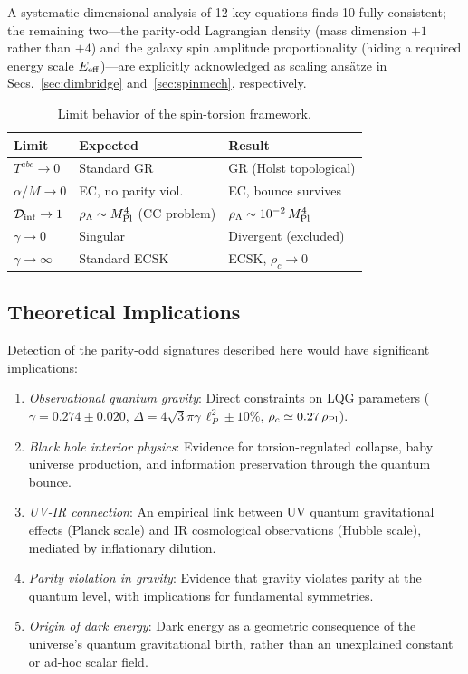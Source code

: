 \documentclass[aps,prd,twocolumn,superscriptaddress,showpacs,preprintnumbers,nofootinbib,longbibliography,floatfix]{revtex4-2}
\newcommand{\Dinf}{\mathcal{D}_{\rm inf}}
\newcommand{\rhoPl}{\rho_{\rm Pl}}
\newcommand{\MPl}{M_{\rm Pl}}
\begin{document}
A systematic dimensional analysis of 12 key equations finds 10 fully consistent; the remaining two---the parity-odd Lagrangian density (mass dimension $+1$ rather than $+4$) and the galaxy spin amplitude proportionality (hiding a required energy scale $E_{\rm eff}$)---are explicitly acknowledged as scaling ans\"atze in Secs.~\ref{sec:dimbridge} and~\ref{sec:spinmech}, respectively.

\begin{table}[h]
\caption{\label{tab:limits} Limit behavior of the spin-torsion framework.}
\begin{ruledtabular}
\begin{tabular}{lll}
Limit & Expected & Result \\
\hline
$T^{abc} \to 0$ & Standard GR & GR (Holst topological) \\
$\alpha/M \to 0$ & EC, no parity viol. & EC, bounce survives \\
$\Dinf \to 1$ & $\rho_\Lambda \sim \MPl^4$ (CC problem) & $\rho_\Lambda \sim 10^{-2}\,\MPl^4$ \\
$\gamma \to 0$ & Singular & Divergent (excluded) \\
$\gamma \to \infty$ & Standard ECSK & ECSK, $\rho_c \to 0$ \\
\end{tabular}
\end{ruledtabular}
\end{table}

\subsection{Theoretical Implications}

Detection of the parity-odd signatures described here would have significant implications:

\begin{enumerate}[leftmargin=*]
\item \textit{Observational quantum gravity}: Direct constraints on LQG parameters ($\gamma = 0.274\pm 0.020$, $\Delta = 4\sqrt{3}\pi\gamma\,\ell_P^2\pm 10\%$, $\rho_c \simeq 0.27\,\rhoPl$).

\item \textit{Black hole interior physics}: Evidence for torsion-regulated collapse, baby universe production, and information preservation through the quantum bounce.

\item \textit{UV-IR connection}: An empirical link between UV quantum gravitational effects (Planck scale) and IR cosmological observations (Hubble scale), mediated by inflationary dilution.

\item \textit{Parity violation in gravity}: Evidence that gravity violates parity at the quantum level, with implications for fundamental symmetries.

\item \textit{Origin of dark energy}: Dark energy as a geometric consequence of the universe's quantum gravitational birth, rather than an unexplained constant or ad-hoc scalar field.
\end{enumerate}
\end{document}
